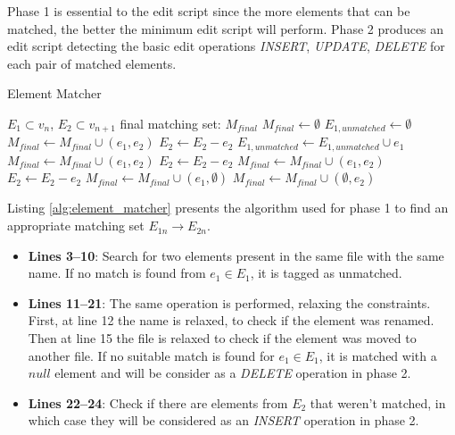 Phase 1 is essential to the edit script since the more elements that can be matched, the better the minimum edit script will perform. Phase 2 produces  an edit script detecting the basic edit operations \emph{INSERT}, \emph{UPDATE}, \emph{DELETE} for each pair of matched elements.

\begin{algorithm}[!t]
\caption{Element Matcher}
\label{alg:element_matcher}
\begin{algorithmic}[1] 
\REQUIRE $E_1 \subset v_n$, $E_2 \subset v_{n+1}$
\ENSURE final matching set: $M_{final}$
\STATE $M_{final} \leftarrow \emptyset$
\STATE $E_{1,unmatched} \leftarrow \emptyset$
\STATE $M_{final} \leftarrow M_{final} \cup (e_1,e_2)$
\STATE $E_2 \leftarrow E_2 - e_2$
\ELSE
\STATE $E_{1,unmatched} \leftarrow E_{1,unmatched} \cup e_1$
\ENDIF
\ENDFOR
{}
\STATE $M_{final} \leftarrow M_{final} \cup (e_1,e_2)$
\STATE $E_2 \leftarrow E_2 - e_2$
\STATE $M_{final} \leftarrow M_{final} \cup (e_1,e_2)$
\STATE $E_2 \leftarrow E_2 - e_2$
\ELSE
\STATE $M_{final} \leftarrow M_{final} \cup (e_1,\emptyset)$
\ENDIF
\ENDFOR
{}
\STATE $M_{final} \leftarrow M_{final} \cup (\emptyset, e_2)$
\ENDFOR
\end{algorithmic}
\end{algorithm}

Listing \ref{alg:element_matcher} presents the algorithm used for phase 1 to find an appropriate matching set $E_{1n} \rightarrow E_{2n}$.

\begin{itemize}
    \item \textbf{Lines 3--10}: Search for two elements present in the same file with the same name. If no match is found from $e_1 \in E_1$, it is tagged as unmatched.

  \item \textbf{Lines 11--21}:  The same operation is performed, relaxing the constraints. First, at line 12 the name is relaxed, to check if the element was renamed. Then at line 15 the file is relaxed to check if the element was moved to another file. If no suitable match is found for $e_1 \in E_1$, it is matched with a $null$ element and will be consider as a \emph{DELETE} operation in phase 2.

\item \textbf{Lines 22--24}: Check if there are elements from $E_2$ that weren't matched, in which case they will be considered as an \emph{INSERT} operation in phase 2.
\end{itemize}

